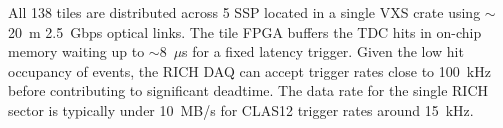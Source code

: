 All 138 tiles are distributed across 5 SSP located in a single VXS crate using $\sim$20~m 2.5~Gbps optical links. The tile FPGA buffers the TDC hits in on-chip memory waiting up to $\sim$8~$\mu$s for a fixed latency trigger. Given the low hit occupancy of events, the RICH DAQ can accept trigger rates close to 100~kHz before contributing to significant deadtime. The data rate for the single RICH sector is typically under 10~MB/s for CLAS12 trigger rates around 15~kHz.


